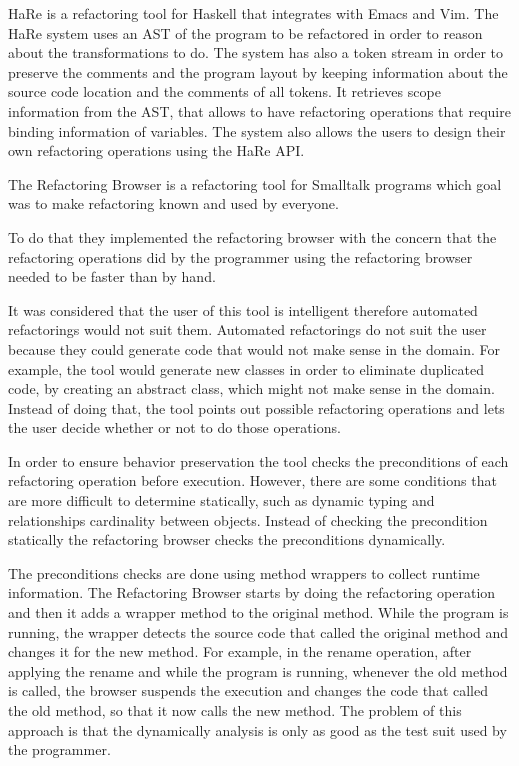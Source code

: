 HaRe \cite{thompson2005refactoring} is a refactoring tool for Haskell that
integrates with Emacs and Vim.
The HaRe system uses an AST of the program to be
refactored in order to reason about the transformations to do.
The system has also a token stream in order to preserve the comments and the
program layout by keeping information about the source code location and the comments of all tokens.
It retrieves scope information from the AST, that allows to have refactoring operations that
require binding information of variables. %
The system also allows the users to design their own refactoring operations
using the HaRe API.




The Refactoring Browser \cite{roberts1997refactoring} is a refactoring tool for
Smalltalk programs which goal was to make refactoring known and used by everyone.

To do that they implemented the refactoring browser with the concern that the
 refactoring operations did by the programmer using the refactoring browser needed to be faster than by hand.

It was considered that the user of this tool is intelligent therefore automated
refactorings would not suit them.
Automated refactorings do not suit the user because they could generate code that
 would not make sense in the domain.
For example, the tool would generate new classes in order to eliminate duplicated
code, by creating an abstract class, which might not make sense in the domain.
Instead of doing that, the tool points out possible refactoring operations and
lets the user decide whether or not to do those operations.

In order to ensure behavior preservation the tool checks the preconditions
of each refactoring operation before execution.
However, there are some conditions that are more difficult to determine statically,
 such as dynamic typing and relationships cardinality between objects.
Instead of checking the precondition statically the refactoring browser checks
the preconditions dynamically.

The preconditions checks are done using method wrappers to collect runtime information.
The Refactoring Browser starts by doing the refactoring operation and then it
adds a wrapper method to the original method.
While the program is running, the wrapper detects the source code that called
the original method and changes it for the new method.
For example, in the rename operation, after applying the rename and while the
program is running, whenever the old method is called, the browser suspends the
execution and changes the code that called the old method, so that it now calls the new method.
The problem of this approach is that the dynamically analysis is only as good
as the test suit used by the programmer.

